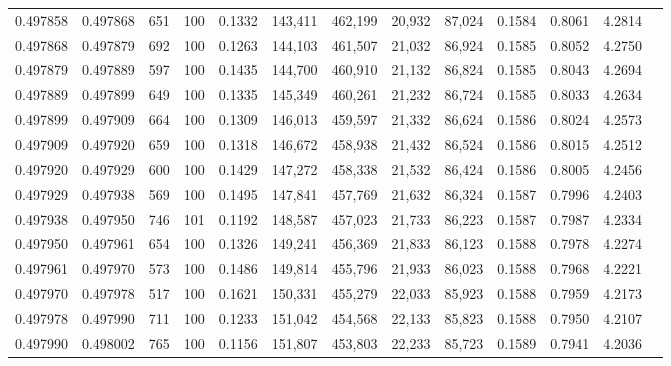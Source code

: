 \begin{tabular}{rrrrrrrrrrrrr}
0.497858 & 0.497868 &   651 & 100 &                                     0.1332 & 143,411 & 462,199 &  20,932 &  87,024 & 0.1584 & 0.8061 & 4.2814 \\
0.497868 & 0.497879 &   692 & 100 &                                     0.1263 & 144,103 & 461,507 &  21,032 &  86,924 & 0.1585 & 0.8052 & 4.2750 \\
0.497879 & 0.497889 &   597 & 100 &                                     0.1435 & 144,700 & 460,910 &  21,132 &  86,824 & 0.1585 & 0.8043 & 4.2694 \\
0.497889 & 0.497899 &   649 & 100 &                                     0.1335 & 145,349 & 460,261 &  21,232 &  86,724 & 0.1585 & 0.8033 & 4.2634 \\
0.497899 & 0.497909 &   664 & 100 &                                     0.1309 & 146,013 & 459,597 &  21,332 &  86,624 & 0.1586 & 0.8024 & 4.2573 \\
0.497909 & 0.497920 &   659 & 100 &                                     0.1318 & 146,672 & 458,938 &  21,432 &  86,524 & 0.1586 & 0.8015 & 4.2512 \\
0.497920 & 0.497929 &   600 & 100 &                                     0.1429 & 147,272 & 458,338 &  21,532 &  86,424 & 0.1586 & 0.8005 & 4.2456 \\
0.497929 & 0.497938 &   569 & 100 &                                     0.1495 & 147,841 & 457,769 &  21,632 &  86,324 & 0.1587 & 0.7996 & 4.2403 \\
0.497938 & 0.497950 &   746 & 101 &                                     0.1192 & 148,587 & 457,023 &  21,733 &  86,223 & 0.1587 & 0.7987 & 4.2334 \\
0.497950 & 0.497961 &   654 & 100 &                                     0.1326 & 149,241 & 456,369 &  21,833 &  86,123 & 0.1588 & 0.7978 & 4.2274 \\
0.497961 & 0.497970 &   573 & 100 &                                     0.1486 & 149,814 & 455,796 &  21,933 &  86,023 & 0.1588 & 0.7968 & 4.2221 \\
0.497970 & 0.497978 &   517 & 100 &                                     0.1621 & 150,331 & 455,279 &  22,033 &  85,923 & 0.1588 & 0.7959 & 4.2173 \\
0.497978 & 0.497990 &   711 & 100 &                                     0.1233 & 151,042 & 454,568 &  22,133 &  85,823 & 0.1588 & 0.7950 & 4.2107 \\
0.497990 & 0.498002 &   765 & 100 &                                     0.1156 & 151,807 & 453,803 &  22,233 &  85,723 & 0.1589 & 0.7941 & 4.2036 \\

\end{tabular}
